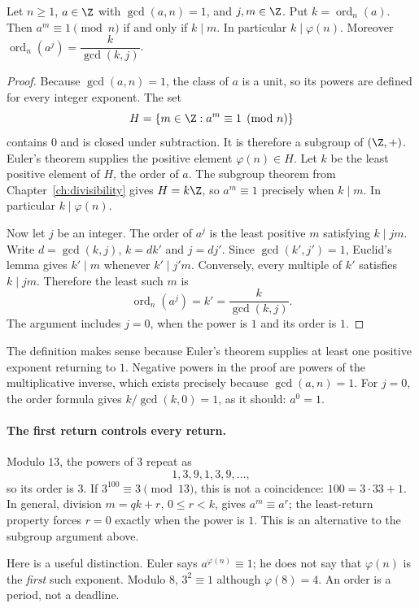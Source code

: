 \begin{proposition}\label{prop:order}
Let $n\ge1$, $a\in\Z$ with $\gcd(a,n)=1$, and
$j,m\in\Z$. Put $k=\operatorname{ord}_n(a)$. Then $a^m\equiv1\pmod n$ if and only if $k\mid m$. In particular $k\mid\varphi(n)$. Moreover $\operatorname{ord}_n(a^j)=\dfrac k{\gcd(k,j)}$.
\end{proposition}
\begin{proof}
Because $\gcd(a,n)=1$, the class of $a$ is a unit,
so its powers are defined for every integer exponent.
The set
\[
H=\{m\in\Z:a^m\equiv1\pmod n\}
\]
contains $0$ and is closed under subtraction. It is
therefore a subgroup of $(\Z,+)$.
Euler's theorem supplies the positive element
$\varphi(n)\in H$. Let $k$ be the least positive
element of $H$, the order of $a$.
The subgroup theorem from Chapter~\ref{ch:divisibility}
gives $H=k\Z$, so $a^m\equiv1$ precisely when $k\mid m$.
In particular $k\mid\varphi(n)$.

Now let $j$ be an integer. The order of $a^j$ is
the least positive $m$ satisfying $k\mid jm$.
Write $d=\gcd(k,j)$, $k=dk'$ and $j=dj'$.
Since $\gcd(k',j')=1$, Euclid's lemma gives
$k'\mid m$ whenever $k'\mid j'm$.
Conversely, every multiple of $k'$ satisfies
$k\mid jm$. Therefore the least such $m$ is
\[
\operatorname{ord}_n(a^j)=k'=\frac{k}{\gcd(k,j)}.
\]
The argument includes $j=0$, when the power is $1$
and its order is $1$.
\end{proof}

The definition makes sense because Euler's theorem supplies at least one
positive exponent returning to $1$. Negative powers in the proof are powers
of the multiplicative inverse, which exists precisely because $\gcd(a,n)=1$.
For $j=0$, the order formula gives $k/\gcd(k,0)=1$, as it should: $a^0=1$.

\paragraph{The first return controls every return.}
Modulo $13$, the powers of $3$ repeat as
\[
1,3,9,1,3,9,\dots,
\]
so its order is $3$.
If $3^{100}\equiv3\pmod{13}$, this is not a coincidence:
$100=3\cdot33+1$. In general, division $m=qk+r$, $0\le r<k$, gives
$a^m\equiv a^r$; the least-return property forces $r=0$ exactly when the
power is $1$. This is an alternative to the subgroup argument above.

Here is a useful distinction. Euler says $a^{\varphi(n)}\equiv1$; he does
not say that $\varphi(n)$ is the \emph{first} such exponent. Modulo $8$,
$3^2\equiv1$ although $\varphi(8)=4$. An order is a period, not a deadline.

